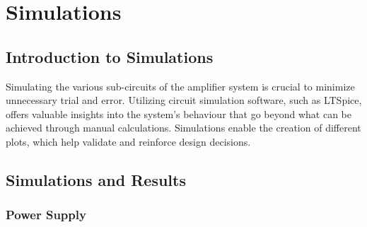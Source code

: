 \chapter{Simulations}
\label{chapter:simulations}
\section{Introduction to Simulations}
Simulating the various sub-circuits of the amplifier system is crucial to minimize unnecessary trial and error. Utilizing circuit simulation software, such as LTSpice, offers valuable insights into the system's behaviour that go beyond what can be achieved through manual calculations. Simulations enable the creation of different plots, which help validate and reinforce design decisions.

\section{Simulations and Results}


\subsection{Power Supply}
